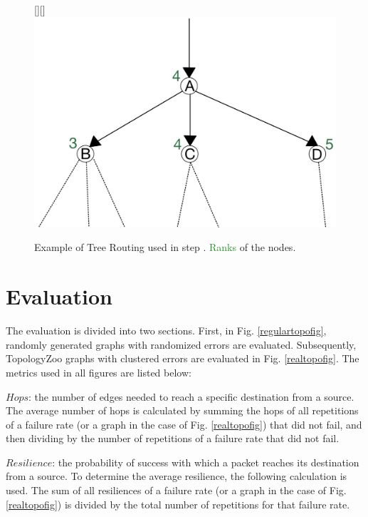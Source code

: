 \documentclass[a4paper,UKenglish,cleveref, autoref, thm-restate,dvipsnames]{lipics-v2021}
\begin{document}
\begin{figure}[h]
    \centering
    \raisebox{0pt}[\height][\depth]{\hspace*{-1cm}\includegraphics[scale=0.15]{figures/treeRoutingExample.jpg}}
    \caption{Example of Tree Routing used in step . \textcolor{ForestGreen}{Ranks} of the nodes.}

    \label{treeRoutingExample}
\end{figure}

\section{Evaluation}
\label{evaluation}

The evaluation is divided into two sections. First, in Fig. \ref{regulartopofig}, randomly generated graphs with randomized errors are evaluated. Subsequently, TopologyZoo \cite{topologyZoo} graphs with clustered errors are evaluated in Fig. \ref{realtopofig}.
The metrics used in all figures are listed below:

$Hops$: the number of edges needed to reach a specific destination from a source. The average number of hops is calculated by summing the hops of all repetitions of a failure rate (or a graph in the case of Fig. \ref{realtopofig}) that did not fail, and then dividing by the number of repetitions of a failure rate that did not fail.

$Resilience$: the probability of success with which a packet reaches its destination from a source. To determine the average resilience, the following calculation is used. The sum of all resiliences of a failure rate (or a graph in the case of Fig. \ref{realtopofig}) is divided by the total number of repetitions for that failure rate.
\end{document}
